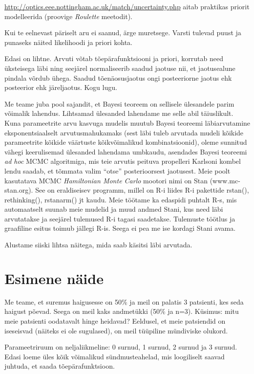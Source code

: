 \documentclass[]{book}
\begin{document}
\url{http://optics.eee.nottingham.ac.uk/match/uncertainty.php} aitab
praktikas priorit modelleerida (proovige \emph{Roulette} meetodit).

Kui te eelnevast päriselt aru ei saanud, ärge muretsege. Varsti tulevad
puust ja punaseks näited likelihoodi ja priori kohta.

Edasi on lihtne. Arvuti võtab tõepärafunktsiooni ja priori, korrutab
need üksteisega läbi ning seejärel normaliseerib saadud jaotuse nii, et
jaotusealune pindala võrdub ühega. Saadud tõenäosusjaotus ongi
posteeriorne jaotus ehk posteerior ehk järeljaotus. Kogu lugu.

Me teame juba pool sajandit, et Bayesi teoreem on sellisele ülesandele
parim võimalik lahendus. Lihtsamad ülesanded lahendame me selle abil
täiuslikult. Kuna parameetrite arvu kasvuga mudelis muutub Bayesi
teoreemi läbiarvutamine eksponentsiaalselt arvutusmahukamaks (sest läbi
tuleb arvutada mudeli kõikide parameetrite kõikide väärtuste
kõikvõimalikud kombinatsioonid), oleme sunnitud vähegi keerulisemad
ülesanded lahendama umbkaudu, asendades Bayesi teoreemi \emph{ad hoc}
MCMC algoritmiga, mis teie arvutis peituva propelleri Karlsoni kombel
lendu saadab, et tõmmata valim ``otse'' posterioorsest jaotusest. Meie
poolt kasutatava MCMC \emph{Hamiltonian Monte Carlo} mootori nimi on
Stan (www.mc-stan.org). See on eraldiseisev programm, millel on R-i
liides R-i pakettide rstan(), rethinking(), rstanarm() jt kaudu. Meie
töötame ka edaspidi puhtalt R-s, mis automaatselt suunab meie mudelid ja
muud andmed Stani, kus need läbi arvutatakse ja seejärel tulemused R-i
tagasi saadetakse. Tulemuste töötlus ja graafiline esitus toimub jällegi
R-is. Seega ei pea me ise kordagi Stani avama.

Alustame siiski lihtsa näitega, mida saab käsitsi läbi arvutada.

\section*{Esimene näide}\label{esimene-naide}

Me teame, et suremus haigusesse on 50\% ja meil on palatis 3 patsienti,
kes seda haigust põevad. Seega on meil kaks andmetükki (50\% ja n=3).
Küsimus: mitu meie patsienti oodatavalt hinge heidavad? Eeldusel, et
meie patsiendid on iseseisvad (näiteks ei ole sugulased), on meil
tüüpiline mündiviske olukord.

Parameetriruum on neljaliikmeline: 0 surnud, 1 surnud, 2 surnud ja 3
surnud. Edasi loeme üles kõik võimalikud sündmusteahelad, mis
loogiliselt saavad juhtuda, et saada tõepärafunktsioon.
\end{document}
